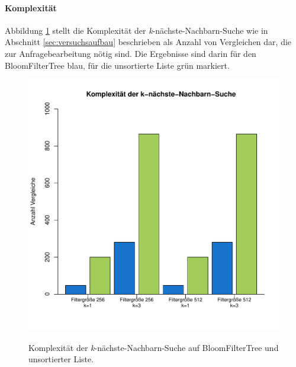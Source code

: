 \paragraph*{Komplexität}
Abbildung \ref{fig:pic18} stellt die Komplexität der \textit{k}-nächste-Nachbarn-Suche wie in Abschnitt \ref{sec:versuchsaufbau} beschrieben als Anzahl von Vergleichen dar, die zur Anfragebearbeitung nötig sind. Die Ergebnisse sind darin für den BloomFilterTree blau, für die unsortierte Liste grün markiert.
\begin{figure}[hptb]
	\centering
	\includegraphics[scale=0.7]{pictures/compl.pdf}\\
	\caption[Komplexität der \textit{k}-nächste-Nachbarn-Suche auf BloomFilterTree und unsortierter Liste]{Komplexität der \textit{k}-nächste-Nachbarn-Suche auf BloomFilterTree und unsortierter Liste.}\label{fig:pic18}
\end{figure} 
